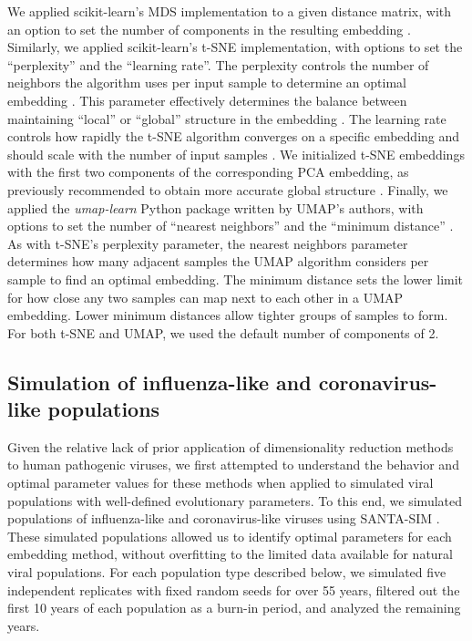 \documentclass[10pt,letterpaper]{article}
\begin{document}
We applied scikit-learn's MDS implementation to a given distance matrix, with an option to set the number of components in the resulting embedding \cite{Pedregosa2011}.
Similarly, we applied scikit-learn's t-SNE implementation, with options to set the ``perplexity'' and the ``learning rate''.
The perplexity controls the number of neighbors the algorithm uses per input sample to determine an optimal embedding \cite{maaten2008visualizing}.
This parameter effectively determines the balance between maintaining ``local'' or ``global'' structure in the embedding \cite{kobak_2019}.
The learning rate controls how rapidly the t-SNE algorithm converges on a specific embedding \cite{Jacobs1988,maaten2008visualizing} and should scale with the number of input samples \cite{Belkina2019}.
We initialized t-SNE embeddings with the first two components of the corresponding PCA embedding, as previously recommended to obtain more accurate global structure \cite{kobak_2019,kobak_2021}.
Finally, we applied the \textit{umap-learn} Python package written by UMAP's authors, with options to set the number of ``nearest neighbors'' and the ``minimum distance'' \cite{lel2018umap}.
As with t-SNE's perplexity parameter, the nearest neighbors parameter determines how many adjacent samples the UMAP algorithm considers per sample to find an optimal embedding.
The minimum distance sets the lower limit for how close any two samples can map next to each other in a UMAP embedding.
Lower minimum distances allow tighter groups of samples to form.
For both t-SNE and UMAP, we used the default number of components of 2.

\subsection*{Simulation of influenza-like and coronavirus-like populations}

Given the relative lack of prior application of dimensionality reduction methods to human pathogenic viruses, we first attempted to understand the behavior and optimal parameter values for these methods when applied to simulated viral populations with well-defined evolutionary parameters.
To this end, we simulated populations of influenza-like and coronavirus-like viruses using SANTA-SIM \cite{Jariani2019}.
These simulated populations allowed us to identify optimal parameters for each embedding method, without overfitting to the limited data available for natural viral populations.
For each population type described below, we simulated five independent replicates with fixed random seeds for over 55 years, filtered out the first 10 years of each population as a burn-in period, and analyzed the remaining years.
\end{document}
